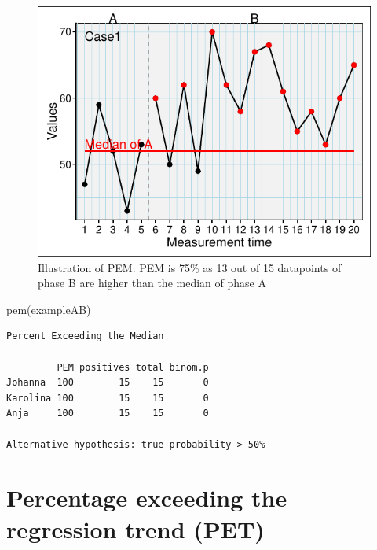 \documentclass[
  letterpaper,
  DIV=11,
  numbers=noendperiod]{scrreprt}
\newenvironment{Shaded}{\begin{snugshade}}{\end{snugshade}}
\newcommand{\FunctionTok}[1]{\textcolor[rgb]{0.28,0.35,0.67}{#1}}
\newcommand{\NormalTok}[1]{\textcolor[rgb]{0.00,0.23,0.31}{#1}}
\begin{document}
\begin{figure}

{\centering \includegraphics{./ch_overlapping_indices_files/figure-pdf/unnamed-chunk-12-1.pdf}

}

\caption{Illustration of PEM. PEM is 75\% as 13 out of 15 datapoints of
phase B are higher than the median of phase A}

\end{figure}

\begin{Shaded}
\begin{Highlighting}[]
\FunctionTok{pem}\NormalTok{(exampleAB)}
\end{Highlighting}
\end{Shaded}

\begin{verbatim}
Percent Exceeding the Median

         PEM positives total binom.p
Johanna  100        15    15       0
Karolina 100        15    15       0
Anja     100        15    15       0

Alternative hypothesis: true probability > 50%
\end{verbatim}

\hypertarget{percentage-exceeding-the-regression-trend-pet}{%
\section{Percentage exceeding the regression trend
(PET)}\label{percentage-exceeding-the-regression-trend-pet}}
\end{document}
